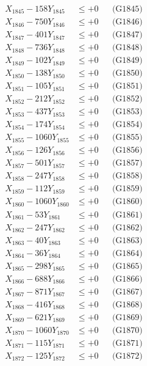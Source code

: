 \documentclass[a4paper,10pt]{article}
\begin{document}
{\begin{align}
X_{1845} - 158Y_{1845} &\leq +0 && \text{(G1845)} \\
X_{1846} - 750Y_{1846} &\leq +0 && \text{(G1846)} \\
X_{1847} - 401Y_{1847} &\leq +0 && \text{(G1847)} \\
X_{1848} - 736Y_{1848} &\leq +0 && \text{(G1848)} \\
X_{1849} - 102Y_{1849} &\leq +0 && \text{(G1849)} \\
X_{1850} - 138Y_{1850} &\leq +0 && \text{(G1850)} \\
\allowbreak
X_{1851} - 105Y_{1851} &\leq +0 && \text{(G1851)} \\
X_{1852} - 212Y_{1852} &\leq +0 && \text{(G1852)} \\
X_{1853} - 437Y_{1853} &\leq +0 && \text{(G1853)} \\
X_{1854} - 174Y_{1854} &\leq +0 && \text{(G1854)} \\
X_{1855} - 1060Y_{1855} &\leq +0 && \text{(G1855)} \\
X_{1856} - 126Y_{1856} &\leq +0 && \text{(G1856)} \\
X_{1857} - 501Y_{1857} &\leq +0 && \text{(G1857)} \\
X_{1858} - 247Y_{1858} &\leq +0 && \text{(G1858)} \\
X_{1859} - 112Y_{1859} &\leq +0 && \text{(G1859)} \\
X_{1860} - 1060Y_{1860} &\leq +0 && \text{(G1860)} \\
\allowbreak
X_{1861} - 53Y_{1861} &\leq +0 && \text{(G1861)} \\
X_{1862} - 247Y_{1862} &\leq +0 && \text{(G1862)} \\
X_{1863} - 40Y_{1863} &\leq +0 && \text{(G1863)} \\
X_{1864} - 36Y_{1864} &\leq +0 && \text{(G1864)} \\
X_{1865} - 298Y_{1865} &\leq +0 && \text{(G1865)} \\
X_{1866} - 688Y_{1866} &\leq +0 && \text{(G1866)} \\
X_{1867} - 871Y_{1867} &\leq +0 && \text{(G1867)} \\
X_{1868} - 416Y_{1868} &\leq +0 && \text{(G1868)} \\
X_{1869} - 621Y_{1869} &\leq +0 && \text{(G1869)} \\
X_{1870} - 1060Y_{1870} &\leq +0 && \text{(G1870)} \\
\allowbreak
X_{1871} - 115Y_{1871} &\leq +0 && \text{(G1871)} \\
X_{1872} - 125Y_{1872} &\leq +0 && \text{(G1872)} \\

\end{align}}
\end{document}
